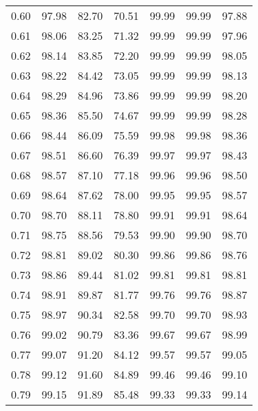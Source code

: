 \begin{tabular}{|c|c|c|c|c|c|c|}
      0.60 &     97.98 &     82.70 &      70.51 &   99.99 &      99.99 &         97.88 \\
      0.61 &     98.06 &     83.25 &      71.32 &   99.99 &      99.99 &         97.96 \\
      0.62 &     98.14 &     83.85 &      72.20 &   99.99 &      99.99 &         98.05 \\
      0.63 &     98.22 &     84.42 &      73.05 &   99.99 &      99.99 &         98.13 \\
      0.64 &     98.29 &     84.96 &      73.86 &   99.99 &      99.99 &         98.20 \\
      0.65 &     98.36 &     85.50 &      74.67 &   99.99 &      99.99 &         98.28 \\
      0.66 &     98.44 &     86.09 &      75.59 &   99.98 &      99.98 &         98.36 \\
      0.67 &     98.51 &     86.60 &      76.39 &   99.97 &      99.97 &         98.43 \\
      0.68 &     98.57 &     87.10 &      77.18 &   99.96 &      99.96 &         98.50 \\
      0.69 &     98.64 &     87.62 &      78.00 &   99.95 &      99.95 &         98.57 \\
      0.70 &     98.70 &     88.11 &      78.80 &   99.91 &      99.91 &         98.64 \\
      0.71 &     98.75 &     88.56 &      79.53 &   99.90 &      99.90 &         98.70 \\
      0.72 &     98.81 &     89.02 &      80.30 &   99.86 &      99.86 &         98.76 \\
      0.73 &     98.86 &     89.44 &      81.02 &   99.81 &      99.81 &         98.81 \\
      0.74 &     98.91 &     89.87 &      81.77 &   99.76 &      99.76 &         98.87 \\
      0.75 &     98.97 &     90.34 &      82.58 &   99.70 &      99.70 &         98.93 \\
      0.76 &     99.02 &     90.79 &      83.36 &   99.67 &      99.67 &         98.99 \\
      0.77 &     99.07 &     91.20 &      84.12 &   99.57 &      99.57 &         99.05 \\
      0.78 &     99.12 &     91.60 &      84.89 &   99.46 &      99.46 &         99.10 \\
      0.79 &     99.15 &     91.89 &      85.48 &   99.33 &      99.33 &         99.14 \\

\end{tabular}
